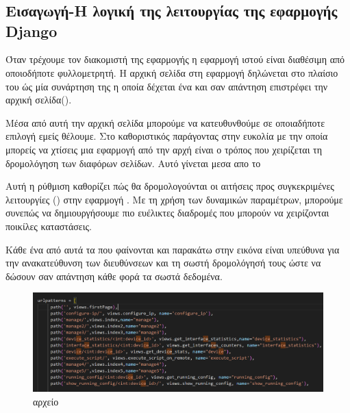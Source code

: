 \chapter{}

\section{Εισαγωγή-Η λογική της λειτουργίας της εφαρμογής Django}

Όταν τρέχουμε τον διακομιστή της εφαρμογής η εφαρμογή ιστού
είναι διαθέσιμη από οποιοδήποτε φυλλομετρητή. Η αρχική σελίδα στη εφαρμογή
 δηλώνεται στο πλαίσιο του  ώς μία συνάρτηση της 
η οποία δέχεται ένα  και σαν απάντηση επιστρέφει την αρχική σελίδα().

Μέσα από αυτή την αρχική σελίδα μπορούμε να κατευθυνθούμε σε οποιαδήποτε επιλογή εμείς θέλουμε.
Στο  καθοριστικός παράγοντας στην ευκολία με την οποία
μπορείς να χτίσεις μια εφαρμογή από την αρχή είναι ο τρόπος που χειρίζεται
τη δρομολόγηση των διαφόρων σελίδων. Αυτό γίνεται μεσα απο το 

Αυτή η ρύθμιση καθορίζει πώς θα δρομολογούνται οι 
αιτήσεις  προς συγκεκριμένες λειτουργίες () 
στην εφαρμογή . Με τη χρήση των δυναμικών παραμέτρων, 
μπορούμε συνεπώς να δημιουργήσουμε πιο ευέλικτες διαδρομές  
που μπορούν να χειρίζονται ποικίλες καταστάσεις. 

Κάθε ένα από αυτά τα  που φαίνονται και παρακάτω στην εικόνα
είναι υπεύθυνα για την ανακατεύθυνση των διευθύνσεων και τη σωστή δρομολόγησή
τους ώστε να δώσουν σαν απάντηση κάθε φορά τα σωστά δεδομένα.


\begin{figure}[h]
	\centering
	\includegraphics[width=1.0\textwidth]{graphics/urls.png}
	\caption{  αρχείο}
\end{figure}

\FloatBarrier



